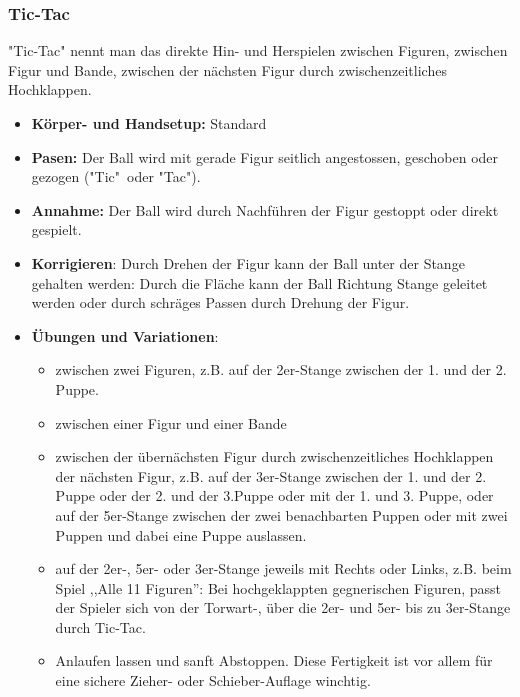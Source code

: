 \subsubsection{Tic-Tac}
"Tic-Tac" nennt man das direkte Hin- und Herspielen zwischen Figuren, zwischen Figur und Bande, zwischen der nächsten Figur durch zwischenzeitliches Hochklappen. 
\begin{itemize}
    \item \textbf{Körper- und Handsetup:} Standard 
    \item \textbf{Pasen:} Der Ball wird mit gerade Figur seitlich angestossen, geschoben oder gezogen ("Tic"\ oder "Tac").
    \item \textbf{Annahme:} Der Ball wird durch Nachführen der Figur gestoppt oder direkt gespielt.
    \item \textbf{Korrigieren}: Durch Drehen der Figur kann der Ball unter der Stange gehalten werden: Durch die Fläche kann der Ball Richtung Stange geleitet werden oder durch schräges Passen durch Drehung der Figur.  
    \item \textbf{Übungen und Variationen}:
        \begin{itemize}
            \item zwischen zwei Figuren, z.B. auf der 2er-Stange zwischen der 1. und der 2. Puppe.
            \item zwischen einer Figur und einer Bande
            \item zwischen der übernächsten Figur durch zwischenzeitliches Hochklappen der nächsten Figur, z.B. auf der 3er-Stange zwischen der 1. und der 2. Puppe oder der 2. und der 3.Puppe oder mit der 1. und 3. Puppe, oder auf der 5er-Stange zwischen der zwei benachbarten Puppen oder mit zwei Puppen und dabei eine Puppe auslassen.
            \item auf der 2er-, 5er- oder 3er-Stange jeweils mit Rechts oder Links, z.B. beim Spiel ,,Alle 11 Figuren'': Bei hochgeklappten gegnerischen Figuren, passt der Spieler sich von der Torwart-, über die 2er- und 5er- bis zu 3er-Stange durch Tic-Tac. 
            \item Anlaufen lassen und sanft Abstoppen. Diese Fertigkeit ist vor allem für eine sichere Zieher- oder Schieber-Auflage winchtig.
        \end{itemize}
\end{itemize}



